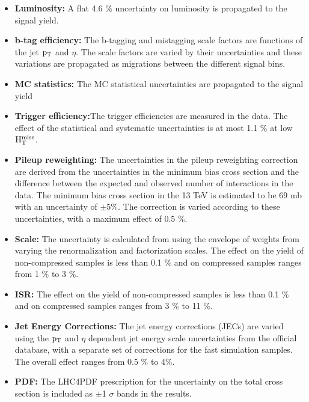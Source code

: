 \begin{itemize}

\item {\bf Luminosity:} A flat 4.6 $\%$ uncertainty on luminosity is propagated to the signal yield. 

\item {\bf b-tag efficiency:} The b-tagging and mistagging scale factors are functions of the jet
 $\rm p_{T}$ and $\eta$. The scale factors are varied by their uncertainties and these variations are propagated as migrations between the different signal bins.

\item {\bf MC statistics:} The MC statistical uncertainties are propagated to the signal yield 

\item {\bf Trigger efficiency:}The trigger efficiencies are measured in the data.
The effect of the statistical and systematic uncertainties is at most 1.1 $\%$ at low $\rm H_{T}^{miss}$.

\item {\bf Pileup reweighting: }The uncertainties in the pileup reweighting correction are derived from the uncertainties in the minimum bias cross section and the difference between the expected and  observed number of interactions in the data. The minimum bias cross section in the 13 TeV is estimated to be 69 mb with an uncertainty of $\pm$5$ \%$. The correction is varied according to these uncertainties, with a maximum effect of 0.5 $\%$.

\item {\bf Scale:} The uncertainty is calculated from using the envelope of weights from varying the renormalization and factorization scales. The effect on the yield of non-compressed samples is less than 0.1 $\%$ and on compressed samples ranges from 1 $ \%$ to 3 $ \%$.

\item {\bf ISR: } The effect on the yield of non-compressed samples is less than 0.1 $\%$ and on compressed samples ranges from 3 $\%$ to 11 $\%$.


\item {\bf Jet Energy Corrections: } The jet energy corrections (JECs) are varied using the $\rm p_{T}$
and $\eta$ dependent jet energy scale uncertainties from the official database, with a separate set of corrections for the fast simulation samples. The overall effect ranges from 0.5 $\%$ to 4$\%$. 

\item {\bf PDF: } The LHC4PDF prescription for the uncertainty on the total cross section is included as $\pm$1 $\sigma$ bands in the results. 

\end{itemize}
 



